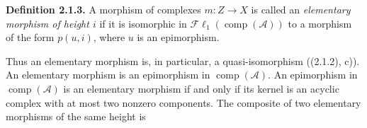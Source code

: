 \medskip\noindent\textbf{Definition 2.1.3.}\quad
A morphism of complexes $m\colon Z\longrightarrow X$ is called an
\emph{elementary morphism of height $i$} if it is isomorphic in
$\mathcal{F}\ell_1(\operatorname{comp}(\mathcal A))$ to a morphism of the
form $p(u,i)$, where $u$ is an epimorphism.

Thus an elementary morphism is, in particular, a quasi-isomorphism
((2.1.2), c)). An elementary morphism is an epimorphism in
$\operatorname{comp}(\mathcal A)$. An epimorphism in
$\operatorname{comp}(\mathcal A)$ is an elementary morphism if and only if
its kernel is an acyclic complex with at most two nonzero components. The
composite of two elementary morphisms of the same height is
\endgroup
